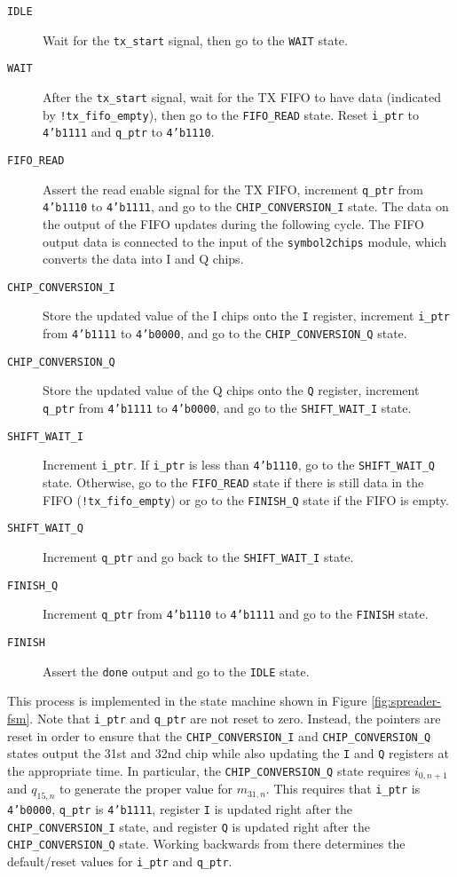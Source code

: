 \begin{description}
	\item[\texttt{IDLE}] Wait for the \texttt{tx\_start} signal, then go to the \texttt{WAIT} state.
	\item[\texttt{WAIT}] After the \texttt{tx\_start} signal, wait for the TX FIFO to have data (indicated by \texttt{!tx\_fifo\_empty}), then go to the \texttt{FIFO\_READ} state. Reset \texttt{i\_ptr} to \texttt{4'b1111} and \texttt{q\_ptr} to \texttt{4'b1110}.
	\item[\texttt{FIFO\_READ}] Assert the read enable signal for the TX FIFO, increment \texttt{q\_ptr} from \texttt{4'b1110} to \texttt{4'b1111}, and go to the \texttt{CHIP\_CONVERSION\_I} state. The data on the output of the FIFO updates during the following cycle. The FIFO output data is connected to the input of the \texttt{symbol2chips} module, which converts the data into I and Q chips.
	\item[\texttt{CHIP\_CONVERSION\_I}] Store the updated value of the I chips onto the \texttt{I} register, increment \texttt{i\_ptr} from \texttt{4'b1111} to \texttt{4'b0000}, and go to the \texttt{CHIP\_CONVERSION\_Q} state.
	\item[\texttt{CHIP\_CONVERSION\_Q}] Store the updated value of the Q chips onto the \texttt{Q} register, increment \texttt{q\_ptr} from \texttt{4'b1111} to \texttt{4'b0000}, and go to the \texttt{SHIFT\_WAIT\_I} state.
	\item[\texttt{SHIFT\_WAIT\_I}] Increment \texttt{i\_ptr}. If \texttt{i\_ptr} is less than \texttt{4'b1110}, go to the \texttt{SHIFT\_WAIT\_Q} state. Otherwise, go to the \texttt{FIFO\_READ} state if there is still data in the FIFO (\texttt{!tx\_fifo\_empty}) or go to the \texttt{FINISH\_Q} state if the FIFO is empty.
	\item[\texttt{SHIFT\_WAIT\_Q}] Increment \texttt{q\_ptr} and go back to the \texttt{SHIFT\_WAIT\_I} state.
	\item[\texttt{FINISH\_Q}] Increment \texttt{q\_ptr} from \texttt{4'b1110} to \texttt{4'b1111} and go to the \texttt{FINISH} state.
	\item[\texttt{FINISH}] Assert the \texttt{done} output and go to the \texttt{IDLE} state.
\end{description}

This process is implemented in the state machine shown in Figure \ref{fig:spreader-fsm}. Note that \texttt{i\_ptr} and \texttt{q\_ptr} are not reset to zero. Instead, the pointers are reset in order to ensure that the \texttt{CHIP\_CONVERSION\_I} and \texttt{CHIP\_CONVERSION\_Q} states output the 31st and 32nd chip while also updating the \texttt{I} and \texttt{Q} registers at the appropriate time. In particular, the \texttt{CHIP\_CONVERSION\_Q} state requires $i_{0,n+1}$ and $q_{15,n}$ to generate the proper value for $m_{31,n}$. This requires that \texttt{i\_ptr} is \texttt{4'b0000}, \texttt{q\_ptr} is \texttt{4'b1111}, register \texttt{I} is updated right after the \texttt{CHIP\_CONVERSION\_I} state, and register \texttt{Q} is updated right after the \texttt{CHIP\_CONVERSION\_Q} state. Working backwards from there determines the default/reset values for \texttt{i\_ptr} and \texttt{q\_ptr}.

